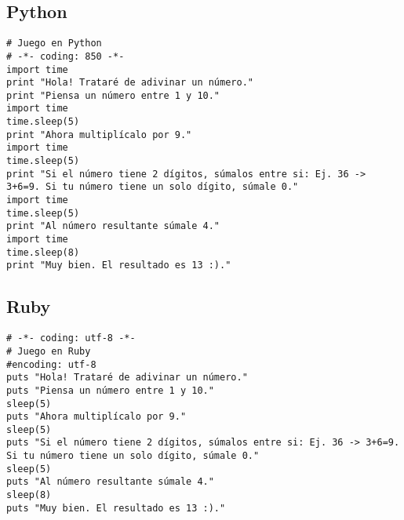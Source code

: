 \documentclass[10pt]{article}
\begin{document}
\subsection{Python}
\begin{verbatim}
# Juego en Python
# -*- coding: 850 -*-
import time
print "Hola! Trataré de adivinar un número."
print "Piensa un número entre 1 y 10."
import time
time.sleep(5)
print "Ahora multiplícalo por 9."
import time
time.sleep(5)
print "Si el número tiene 2 dígitos, súmalos entre si: Ej. 36 -> 3+6=9. Si tu número tiene un solo dígito, súmale 0."
import time
time.sleep(5)
print "Al número resultante súmale 4."
import time
time.sleep(8)
print "Muy bien. El resultado es 13 :)."
\end{verbatim}

\subsection{Ruby}
\begin{verbatim}
# -*- coding: utf-8 -*-
# Juego en Ruby
#encoding: utf-8
puts "Hola! Trataré de adivinar un número."
puts "Piensa un número entre 1 y 10."
sleep(5)
puts "Ahora multiplícalo por 9."
sleep(5)
puts "Si el número tiene 2 dígitos, súmalos entre si: Ej. 36 -> 3+6=9. Si tu número tiene un solo dígito, súmale 0."
sleep(5)
puts "Al número resultante súmale 4."
sleep(8)
puts "Muy bien. El resultado es 13 :)."
\end{verbatim}
\end{document}

